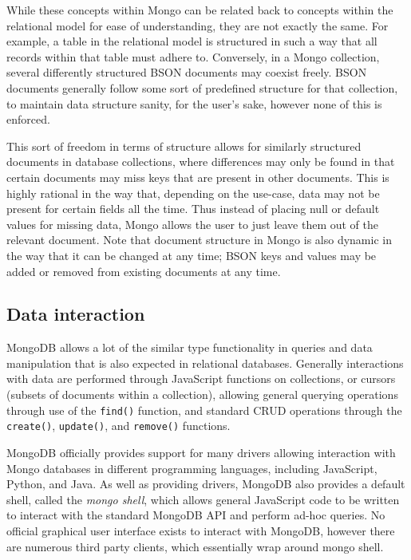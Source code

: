 \documentclass[a4paper,11pt]{article}
\begin{document}
While these concepts within Mongo can be related back to concepts within the relational model for ease of understanding,
they are not exactly the same. For example, a table in the relational model is structured in such a way that all records
within that table must adhere to. Conversely, in a Mongo collection, several differently structured BSON documents may
coexist freely. BSON documents generally follow some sort of predefined structure for that collection, to maintain
data structure sanity, for the user's sake, however none of this is enforced.

This sort of freedom in terms of structure allows for similarly structured documents in database collections, where
differences may only be found in that certain documents may miss keys that are present in other documents. This is
highly rational in the way that, depending on the use-case, data may not be present for certain fields all the time.
Thus instead of placing null or default values for missing data, Mongo allows the user to just leave them out of the
relevant document. Note that document structure in Mongo is also dynamic in the way that it can be changed at any time;
BSON keys and values may be added or removed from existing documents at any time.


\subsection{Data interaction} %
\label{sub:data_interaction}

MongoDB allows a lot of the similar type functionality in queries and data manipulation that is also expected in
relational databases. Generally interactions with data are performed through JavaScript functions on collections, or cursors
(subsets of documents within a collection), allowing general querying operations through use of the \texttt{find()} function,
and standard CRUD operations through the \texttt{create()}, \texttt{update()}, and \texttt{remove()} functions.

MongoDB officially provides support for many drivers allowing interaction with Mongo databases in different programming
languages, including JavaScript, Python, and Java. As well as providing drivers, MongoDB also provides a default shell,
called the \textit{mongo shell}, which allows general JavaScript code to be written to interact with the standard MongoDB
API and perform ad-hoc queries. No official graphical user interface exists to interact with MongoDB, however there
are numerous third party clients, which essentially wrap around mongo shell.
\end{document}
